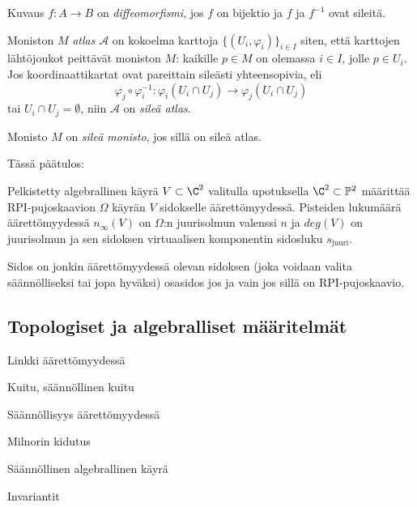 \begin{maaritelma}
    Kuvaus $f:A\to B$ on \emph{diffeomorfismi}, jos $f$ on bijektio ja $f$ ja $f^{-1}$ ovat sileitä.
\end{maaritelma}
\begin{maaritelma}
    Moniston $M$ \emph{atlas} $\mathcal{A}$ on kokoelma karttoja $\{(U_i,\varphi_i)\}_{i\in I}$ siten, että karttojen lähtöjoukot peittävät moniston $M$: kaikille $p\in M$ on olemassa $i\in I$, jolle $p\in U_i$. Jos koordinaattikartat ovat pareittain sileästi yhteensopivia, eli
    \begin{equation}
        \varphi_j\circ\varphi_i^{-1}:\varphi_i(U_i\cap U_j)\to\varphi_j(U_i\cap U_j)
    \end{equation}
    tai $U_i\cap U_j=\emptyset$, niin $\mathcal{A}$ on \emph{sileä atlas}.
\end{maaritelma}
\begin{maaritelma}
    Monisto $M$ on \emph{sileä monisto}, jos sillä on sileä atlas.
\end{maaritelma}


Tässä päätulos:
\begin{lause}
    Pelkistetty algebrallinen käyrä $V\subset\C^2$ valitulla upotuksella $\C^2\subset\mathbb{P}^2$ määrittää RPI-pujoskaavion $\Omega$ käyrän $V$ sidokselle äärettömyydessä. Pisteiden lukumäärä äärettömyydessä $n_\infty(V)$ on $\Omega$:n juurisolmun valenssi $n$ ja $deg(V)$ on juurisolmun ja sen sidoksen virtuaalisen komponentin sidosluku $s_\text{juuri}$.
\end{lause}
\begin{lause}
    Sidos on jonkin äärettömyydessä olevan sidoksen (joka voidaan valita säännölliseksi tai jopa hyväksi) osasidos jos ja vain jos sillä on RPI-pujoskaavio.
\end{lause}


\subsection{Topologiset ja algebralliset määritelmät}
\begin{maaritelma}
    Linkki äärettömyydessä
\end{maaritelma}
\begin{maaritelma}
    Kuitu, säännöllinen kuitu
\end{maaritelma}
\begin{maaritelma}
    Säännöllisyys äärettömyydessä
\end{maaritelma}
\begin{maaritelma}
    Milnorin kidutus
\end{maaritelma}
\begin{maaritelma}
    Säännöllinen algebrallinen käyrä
\end{maaritelma}
\begin{propositio}
    Invariantit
\end{propositio}
